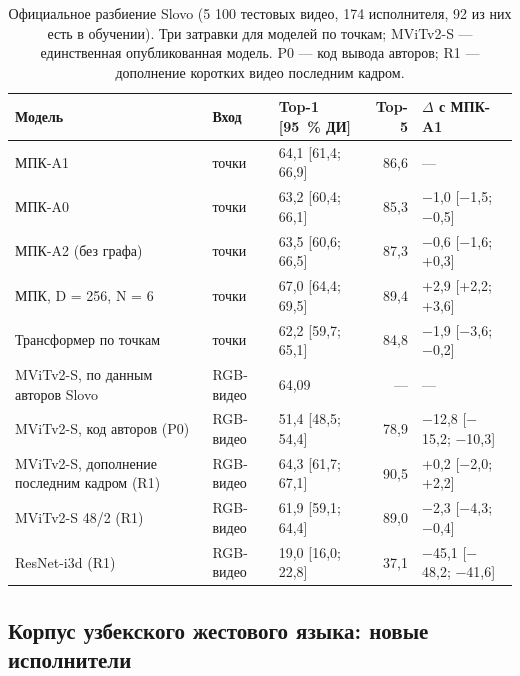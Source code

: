 \documentclass[a4paper,fleqn]{cas-dc}
\begin{document}
\begin{table}[t]
\caption{Официальное разбиение Slovo (5 100 тестовых видео, 174 исполнителя, 92 из них есть в обучении). Три затравки для моделей по точкам; MViTv2-S — единственная опубликованная модель. P0 — код вывода авторов; R1 — дополнение коротких видео последним кадром.}\label{tab:official}
\footnotesize
\centering
\begin{tabular}{lllrl}
\toprule
\textbf{Модель} & \textbf{Вход} & \textbf{Top-1 [95~\% ДИ]} & \textbf{Top-5} & \textbf{$\Delta$ с МПК-A1} \\
\midrule
МПК-A1 & точки & 64,1 [61,4; 66,9] & 86,6 & --- \\
МПК-A0 & точки & 63,2 [60,4; 66,1] & 85,3 & $-$1,0 [$-$1,5; $-$0,5] \\
МПК-A2 (без графа) & точки & 63,5 [60,6; 66,5] & 87,3 & $-$0,6 [$-$1,6; +0,3] \\
МПК, D = 256, N = 6 & точки & 67,0 [64,4; 69,5] & 89,4 & +2,9 [+2,2; +3,6] \\
Трансформер по точкам & точки & 62,2 [59,7; 65,1] & 84,8 & $-$1,9 [$-$3,6; $-$0,2] \\
MViTv2-S, по данным авторов Slovo & RGB-видео & 64,09 & --- & --- \\
MViTv2-S, код авторов (P0) & RGB-видео & 51,4 [48,5; 54,4] & 78,9 & $-$12,8 [$-$15,2; $-$10,3] \\
MViTv2-S, дополнение последним кадром (R1) & RGB-видео & 64,3 [61,7; 67,1] & 90,5 & +0,2 [$-$2,0; +2,2] \\
MViTv2-S 48/2 (R1) & RGB-видео & 61,9 [59,1; 64,4] & 89,0 & $-$2,3 [$-$4,3; $-$0,4] \\
ResNet-i3d (R1) & RGB-видео & 19,0 [16,0; 22,8] & 37,1 & $-$45,1 [$-$48,2; $-$41,6] \\
\bottomrule
\end{tabular}
\end{table}

\hypertarget{ux43aux43eux440ux43fux443ux441-ux443ux437ux431ux435ux43aux441ux43aux43eux433ux43e-ux436ux435ux441ux442ux43eux432ux43eux433ux43e-ux44fux437ux44bux43aux430-ux43dux43eux432ux44bux435-ux438ux441ux43fux43eux43bux43dux438ux442ux435ux43bux438}{%
\subsection{Корпус узбекского жестового языка: новые исполнители}\label{ux43aux43eux440ux43fux443ux441-ux443ux437ux431ux435ux43aux441ux43aux43eux433ux43e-ux436ux435ux441ux442ux43eux432ux43eux433ux43e-ux44fux437ux44bux43aux430-ux43dux43eux432ux44bux435-ux438ux441ux43fux43eux43bux43dux438ux442ux435ux43bux438}}
\end{document}
